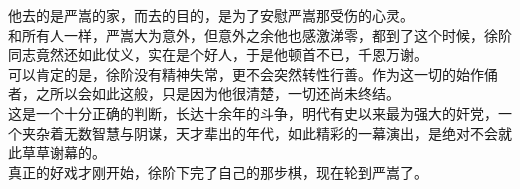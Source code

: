 \begin{multicols}{\theparacolNo}
他去的是严嵩的家，而去的目的，是为了安慰严嵩那受伤的心灵。\\

和所有人一样，严嵩大为意外，但意外之余他也感激涕零，都到了这个时候，徐阶同志竟然还如此仗义，实在是个好人，于是他顿首不已，千恩万谢。\\

可以肯定的是，徐阶没有精神失常，更不会突然转性行善。作为这一切的始作俑者，之所以会如此这般，只是因为他很清楚，一切还尚未终结。\\

这是一个十分正确的判断，长达十余年的斗争，明代有史以来最为强大的奸党，一个夹杂着无数智慧与阴谋，天才辈出的年代，如此精彩的一幕演出，是绝对不会就此草草谢幕的。\\

真正的好戏才刚开始，徐阶下完了自己的那步棋，现在轮到严嵩了。\\
\ifnum{}
	\end{multicols}
\fi